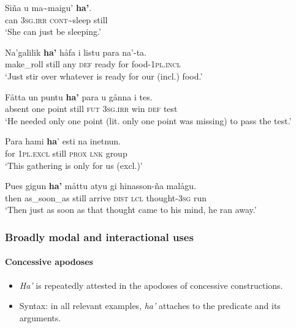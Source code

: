 \begin{exe}	\ex\label{exAppendixChamorroRestrictive1}
	\gll Siña u ma\sim{}maigu' \textbf{ha'}.\\
	can 3\textsc{sg}.\textsc{irr} \textsc{cont}\sim{}sleep still\\
	\glt \lq She can just be sleeping.' \parencite[39]{Chung2020}	

\ex\label{exAppendixChamorroRestrictive2}
	\gll Na’galilik \textbf{ha’} håfa i listu para na’-ta.\\
	 make\_roll still any \textsc{def} ready for food-1\textsc{pl}.\textsc{incl}\\
	 \glt \lq Just stir over whatever is ready for our (incl.) food.\rq{ }\parencite[201]{Chung2020}

\ex\label{exAppendixChamorroRestrictive3}
	\gll Fåtta un puntu \textbf{ha’} para u gånna i tes.\\
absent one point still \textsc{fut} 3\textsc{sg}.\textsc{irr} win \textsc{def} test\\
	\glt \lq He needed only one point (lit. only one point was missing) to pass the test.’ \parencite[514]{Chung2020}

\ex\label{exAppendixChamorroRestrictive4}
	\gll Para hami \textbf{ha}' esti na inetnun.\\
	for 1\textsc{pl}.\textsc{excl} still \textsc{prox} \textsc{lnk} group\\
	\glt \lq This gathering is only for us (excl.)' \parencite[514]{Chung2020}
		
\ex\label{exAppendixChamorroRestrictive5}
	\gll Pues gigun \textbf{ha'} måttu atyu gi hinasson-ña malågu.\\
	then as\_soon\_as still arrive \textsc{dist} \textsc{lcl} thought-3\textsc{sg} run\\
	\glt \lq Then just as soon as that thought came to his mind, he ran away.' \parencite[516]{Chung2020}
\end{exe}

\subsubsection{Broadly modal and interactional uses}
\paragraph{Concessive apodoses}
\label{appendixChamorroConcessiveConsequent}
\begin{itemize}
	\item \textit{Ha'} is repeatedly attested in the apodoses of concessive constructions.
	\item Syntax: in all relevant examples, \textit{ha'} attaches to the predicate and its arguments.
\end{itemize}

